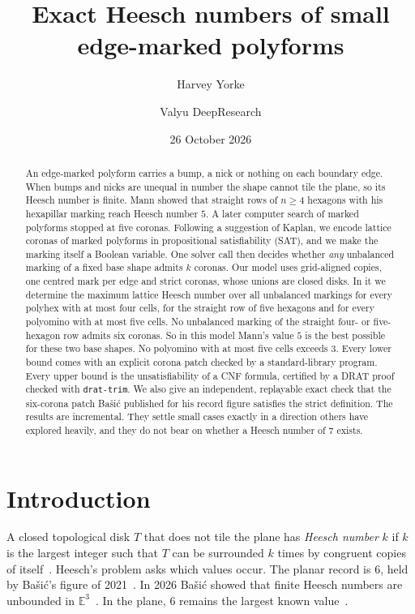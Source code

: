 \documentclass[11pt]{amsart}
\title{Exact Heesch numbers of small edge-marked polyforms}
\author{Harvey Yorke}
\author{Valyu DeepResearch}
\date{26 October 2026}
\theoremstyle{definition}
\theoremstyle{remark}
\begin{document}
\raggedbottom
\begin{abstract}
An edge-marked polyform carries a bump, a nick or nothing on each boundary edge. When bumps and nicks are unequal in number the shape cannot tile the plane, so its Heesch number is finite. Mann showed that straight rows of $n\ge4$ hexagons with his hexapillar marking reach Heesch number $5$. A later computer search of marked polyforms stopped at five coronas. Following a suggestion of Kaplan, we encode lattice coronas of marked polyforms in propositional satisfiability (SAT), and we make the marking itself a Boolean variable. One solver call then decides whether \emph{any} unbalanced marking of a fixed base shape admits $k$ coronas. Our model uses grid-aligned copies, one centred mark per edge and strict coronas, whose unions are closed disks. In it we determine the maximum lattice Heesch number over all unbalanced markings for every polyhex with at most four cells, for the straight row of five hexagons and for every polyomino with at most five cells. No unbalanced marking of the straight four- or five-hexagon row admits six coronas. So in this model Mann's value $5$ is the best possible for these two base shapes. No polyomino with at most five cells exceeds $3$. Every lower bound comes with an explicit corona patch checked by a standard-library program. Every upper bound is the unsatisfiability of a CNF formula, certified by a DRAT proof checked with \texttt{drat-trim}. We also give an independent, replayable exact check that the six-corona patch Ba\v{s}i\'c published for his record figure satisfies the strict definition. The results are incremental. They settle small cases exactly in a direction others have explored heavily, and they do not bear on whether a Heesch number of $7$ exists.
\end{abstract}
\maketitle

\section{Introduction}

A closed topological disk $T$ that does not tile the plane has \emph{Heesch number} $k$ if $k$ is the largest integer such that $T$ can be surrounded $k$ times by congruent copies of itself~\cite{Heesch1968,GS1987}. Heesch's problem asks which values occur. The planar record is $6$, held by Ba\v{s}i\'c's figure of 2021~\cite{Basic2021}. In 2026 Ba\v{s}i\'c showed that finite Heesch numbers are unbounded in $\mathbb E^3$~\cite{Basic2026}. In the plane, $6$ remains the largest known value~\cite{Basic2026,Kaplan2025}.
\end{document}
